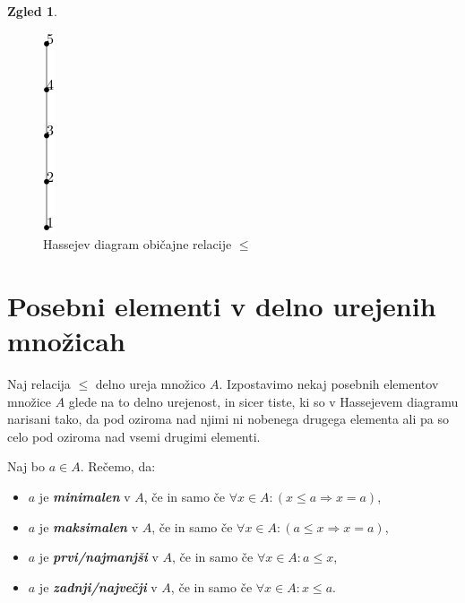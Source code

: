 \documentclass[11pt]{book}
\def\definicija{\color{rdeca}\bf\em}
\theoremstyle{definition}
\theoremstyle{zgled}
\newtheorem*{zgled}{Zgled}
\theoremstyle{odprtproblem}
\theoremstyle{domacanaloga}
\theoremstyle{izrek}
\begin{document}
\begin{zgled}
\begin{itemize}
    \begin{figure}[h]
        \centering
        \includegraphics[height=0.5\linewidth]{img/relacije-hasse-linearna.png}
        \caption{Hassejev diagram običajne relacije $\leq$}
    \end{figure}

\end{itemize}
\end{zgled}

\section{Posebni elementi v delno urejenih množicah}

Naj relacija $\leq$ delno ureja množico $A$. Izpostavimo nekaj posebnih elementov množice $A$ glede na to delno urejenost, in sicer tiste, ki so v Hassejevem diagramu narisani tako, da pod oziroma nad njimi ni nobenega drugega elementa ali pa so celo pod oziroma nad vsemi drugimi elementi. 

Naj bo $a \in A$. Rečemo, da:
\begin{itemize}
    \item $a$ je {\definicija minimalen} v $A$, če in samo če $\forall x \in A \colon (x \leq a \Rightarrow x = a)$,
    \item $a$ je {\definicija maksimalen} v $A$, če in samo če $\forall x \in A \colon (a \leq x \Rightarrow x = a)$,
    \item $a$ je {\definicija prvi/najmanjši} v $A$, če in samo če $\forall x \in A \colon a \leq x$,
    \item $a$ je {\definicija zadnji/največji} v $A$, če in samo če $\forall x \in A \colon x \leq a$.
\end{itemize}
\end{document}
